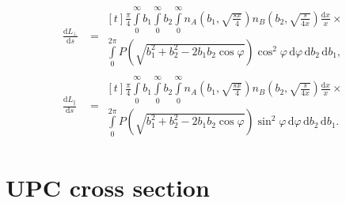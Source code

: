 \documentclass[a4paper,12pt]{article}
\begin{document}
\begin{equation}
  \begin{aligned}
    \frac{\mathrm{d} L_\perp }{\mathrm{d} s}
    &= \begin{multlined}[t]
         \frac{\pi}{4}
         \int\limits_0^\infty
           b_1
           \int\limits_0^\infty
             b_2
             \int\limits_0^\infty
               n_A \left( b_1, \sqrt{\frac{sx}{4}} \right)
               n_B \left( b_2, \sqrt{\frac{s}{4x}} \right)
             \frac{\mathrm{d} x}{x}
      \times {} \\
             \int\limits_0^{2 \pi}
               P \left( \sqrt{b_1^2 + b_2^2 - 2 b_1 b_2 \cos \varphi} \right)
               \cos^2 \varphi
             \, \mathrm{d} \varphi
           \, \mathrm{d} b_2
         \, \mathrm{d} b_1,
       \end{multlined}
    \\
    \frac{\mathrm{d} L_\parallel }{\mathrm{d} s}
    &= \begin{multlined}[t]
         \frac{\pi}{4}
         \int\limits_0^\infty
           b_1
           \int\limits_0^\infty
             b_2
             \int\limits_0^\infty
               n_A \left( b_1, \sqrt{\frac{sx}{4}} \right)
               n_B \left( b_2, \sqrt{\frac{s}{4x}} \right)
             \frac{\mathrm{d} x}{x}
      \times {} \\
             \int\limits_0^{2 \pi}
               P \left( \sqrt{b_1^2 + b_2^2 - 2 b_1 b_2 \cos \varphi} \right)
               \sin^2 \varphi
             \, \mathrm{d} \varphi
           \, \mathrm{d} b_2
         \, \mathrm{d} b_1.
       \end{multlined}
  \end{aligned}
\end{equation}

\section{UPC cross section}
\end{document}
